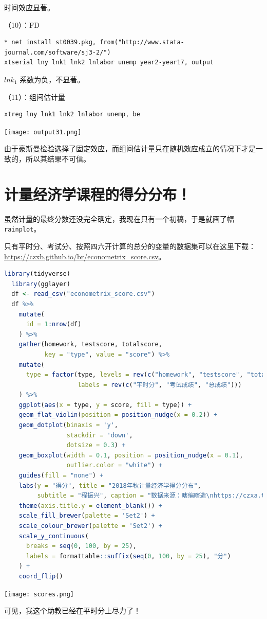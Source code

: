 \documentclass[cn,fancy,blue,11pt]{elegantbook}
\begin{document}
时间效应显著。

（10）：FD

\begin{lstlisting}
* net install st0039.pkg, from("http://www.stata-journal.com/software/sj3-2/")
xtserial lny lnk1 lnk2 lnlabor unemp year2-year17, output
\end{lstlisting}

\(lnk_1\) 系数为负，不显著。

（11）：组间估计量

\begin{lstlisting}
xtreg lny lnk1 lnk2 lnlabor unemp, be
\end{lstlisting}

\noindent\texttt{[image: output31.png]}

由于豪斯曼检验选择了固定效应，而组间估计量只在随机效应成立的情况下才是一致的，所以其结果不可信。

\nocite{*}


\appendix

\chapter{计量经济学课程的得分分布！}

虽然计量的最终分数还没完全确定，我现在只有一个初稿，于是就画了幅 \lstinline{rainplot}。

只有平时分、考试分、按照四六开计算的总分的变量的数据集可以在这里下载：\url{https://czxb.github.io/br/econometrix_score.csv}。

\begin{lstlisting}[language = R]
  library(tidyverse)
  library(gglayer)
  df <- read_csv("econometrix_score.csv")
  df %>%
    mutate(
      id = 1:nrow(df)
    ) %>%
    gather(homework, testscore, totalscore,
           key = "type", value = "score") %>%
    mutate(
      type = factor(type, levels = rev(c("homework", "testscore", "totalscore")),
                    labels = rev(c("平时分", "考试成绩", "总成绩")))
    ) %>%
    ggplot(aes(x = type, y = score, fill = type)) +
    geom_flat_violin(position = position_nudge(x = 0.2)) +
    geom_dotplot(binaxis = 'y',
                 stackdir = 'down',
                 dotsize = 0.3) +
    geom_boxplot(width = 0.1, position = position_nudge(x = 0.1),
                 outlier.color = "white") +
    guides(fill = "none") +
    labs(y = "得分", title = "2018年秋计量经济学得分分布",
         subtitle = "程振兴", caption = "数据来源：瞎编瞎造\nhttps://czxa.top") +
    theme(axis.title.y = element_blank()) +
    scale_fill_brewer(palette = 'Set2') +
    scale_colour_brewer(palette = 'Set2') +
    scale_y_continuous(
      breaks = seq(0, 100, by = 25),
      labels = formattable::suffix(seq(0, 100, by = 25), "分")
    ) +
    coord_flip()
\end{lstlisting}

\noindent\texttt{[image: scores.png]}

可见，我这个助教已经在平时分上尽力了！
\end{document}
